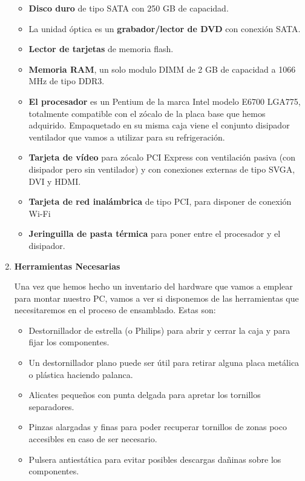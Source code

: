 \begin{enumerate}
\begin{itemize}
    \item \textbf{Disco duro} de tipo SATA con 250 GB de capacidad.
    \item La unidad óptica es un \textbf{grabador/lector de DVD} con conexión SATA.
    \item \textbf{Lector de tarjetas} de memoria flash.
    \item \textbf{Memoria RAM}, un solo modulo DIMM de 2 GB de capacidad a 1066 MHz de tipo DDR3.
    \item \textbf{El procesador} es un Pentium de la marca Intel modelo E6700 LGA775, totalmente compatible con el zócalo de la placa base que hemos adquirido. Empaquetado en su misma caja viene el conjunto disipador ventilador que vamos a utilizar para su refrigeración.
    \item \textbf{Tarjeta de vídeo} para zócalo PCI Express con ventilación pasiva (con disipador pero sin ventilador) y con conexiones externas de tipo SVGA, DVI y HDMI.
    \item \textbf{Tarjeta de red inalámbrica} de tipo PCI, para disponer de conexión Wi-Fi
    \item \textbf{Jeringuilla de pasta térmica} para poner entre el procesador y el disipador.
    \end{itemize}

    \item \textbf{Herramientas Necesarias}

    Una vez que hemos hecho un inventario del hardware que vamos a emplear para montar nuestro PC, vamos a ver si disponemos de las herramientas que necesitaremos en el proceso de ensamblado. Estas son:

    \begin{itemize}
        \item Destornillador de estrella (o Philips) para abrir y cerrar la caja y para fijar los componentes.
        \item Un destornillador plano puede ser útil para retirar alguna placa metálica o plástica haciendo palanca.
        \item Alicates pequeños con punta delgada para apretar los tornillos separadores.
        \item Pinzas alargadas y finas para poder recuperar tornillos de zonas poco accesibles en caso de ser necesario.
        \item Pulsera antiestática para evitar posibles descargas dañinas sobre los componentes.
    \end{itemize}


\end{enumerate}
